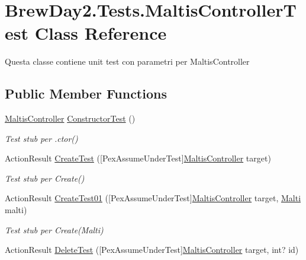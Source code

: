 \hypertarget{class_brew_day2_1_1_tests_1_1_maltis_controller_test}{}\section{Brew\+Day2.\+Tests.\+Maltis\+Controller\+Test Class Reference}
\label{class_brew_day2_1_1_tests_1_1_maltis_controller_test}


Questa classe contiene unit test con parametri per Maltis\+Controller 


\subsection*{Public Member Functions}
\begin{DoxyCompactItemize}
\item 
\mbox{\hyperlink{class_brew_day2_1_1_controllers_1_1_maltis_controller}{Maltis\+Controller}} \mbox{\hyperlink{class_brew_day2_1_1_tests_1_1_maltis_controller_test_a4172f3e4782ba5e0b63fdf77bdfd99bd}{Constructor\+Test}} ()
\begin{DoxyCompactList}\small\item\em Test stub per .ctor()\end{DoxyCompactList}\item 
Action\+Result \mbox{\hyperlink{class_brew_day2_1_1_tests_1_1_maltis_controller_test_ab3df133fcf96ea27ef290885ac2be0d1}{Create\+Test}} (\mbox{[}Pex\+Assume\+Under\+Test\mbox{]}\mbox{\hyperlink{class_brew_day2_1_1_controllers_1_1_maltis_controller}{Maltis\+Controller}} target)
\begin{DoxyCompactList}\small\item\em Test stub per Create()\end{DoxyCompactList}\item 
Action\+Result \mbox{\hyperlink{class_brew_day2_1_1_tests_1_1_maltis_controller_test_ad3b0dc60cf0e0d41c54b41327c7881d2}{Create\+Test01}} (\mbox{[}Pex\+Assume\+Under\+Test\mbox{]}\mbox{\hyperlink{class_brew_day2_1_1_controllers_1_1_maltis_controller}{Maltis\+Controller}} target, \mbox{\hyperlink{class_brew_day2_1_1_models_1_1_malti}{Malti}} malti)
\begin{DoxyCompactList}\small\item\em Test stub per Create(\+Malti)\end{DoxyCompactList}\item 
Action\+Result \mbox{\hyperlink{class_brew_day2_1_1_tests_1_1_maltis_controller_test_a46fb89f9f2b7a6205530159c7361fc53}{Delete\+Test}} (\mbox{[}Pex\+Assume\+Under\+Test\mbox{]}\mbox{\hyperlink{class_brew_day2_1_1_controllers_1_1_maltis_controller}{Maltis\+Controller}} target, int? id)

\end{DoxyCompactItemize}
